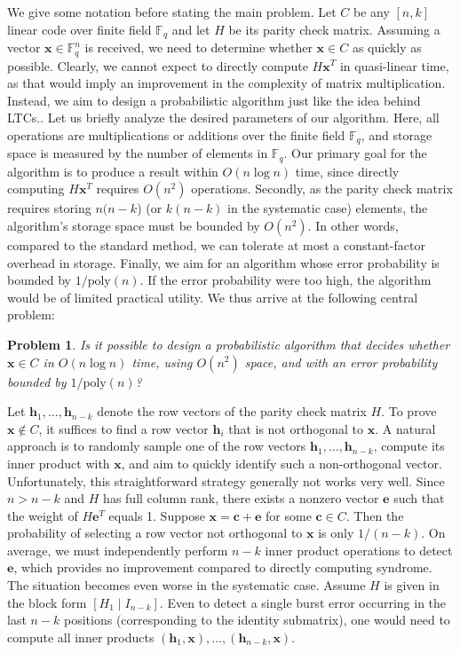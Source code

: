 \documentclass[a4paper, 10pt]{article}
\newtheorem{prob}[theorem]{Problem}
\begin{document}
 We give some notation before stating the main problem. Let $C$ be any $[n,k]$ linear code over finite field $\mathbb{F}_q$ and let $H$ be its parity check matrix. Assuming a vector $\mathbf{x}\in \mathbb{F}_q^n$ is received, we need to determine whether $\mathbf{x}\in C$ as quickly as possible. Clearly, we cannot expect to directly compute $H\mathbf{x}^T$ in quasi-linear time, as that would imply an improvement in the complexity of matrix multiplication. Instead, we aim to design a probabilistic algorithm just like the idea behind LTCs.. Let us briefly analyze the desired parameters of our algorithm. Here, all operations are multiplications or additions over the finite field $\mathbb{F}_q$, and storage space is measured by the number of elements in $\mathbb{F}_q$. Our primary goal for the algorithm is to produce a result within $ O(n\log n)$ time, since directly computing $H\mathbf{x}^T$ requires $O(n^2)$ operations. Secondly, as the parity check matrix requires storing $n(n-k$) (or $k(n-k)$ in the systematic case) elements, the algorithm's storage space must be bounded by $O(n^2)$. In other words, compared to the standard method, we can tolerate at most a constant-factor overhead in storage.  Finally, we aim for an algorithm whose error probability is bounded by $1/\mathrm{poly}(n)$. If the error probability were too high, the algorithm would  be of limited practical utility. We thus arrive at the following central problem:
\begin{prob}
\label{prob1.1}
    Is it possible to design a probabilistic algorithm that decides whether $\mathbf{x}\in C$ in $O(n \log n)$ time, using $O(n^2)$ space, and with an error probability bounded by $1/\mathrm{poly}(n)$?
\end{prob}

Let $\mathbf{h}_1, \dots, \mathbf{h}_{n-k}$ denote the row vectors of the parity check matrix $H$. 
To prove $\mathbf{x} \notin C$, it suffices to find a row vector $\mathbf{h}_i$ that is not orthogonal to $\mathbf{x}$. 
A natural approach is to randomly sample one of the row vectors $\mathbf{h}_1, \dots, \mathbf{h}_{n-k}$, 
compute its inner product with $\mathbf{x}$, and aim to quickly identify such a non-orthogonal vector. Unfortunately, this straightforward strategy generally not works very well. 
Since $n>n -k$ and $H$ has full column rank, there exists a nonzero vector $\mathbf{e}$ such that the weight of $H\mathbf{e}^T$ equals 1. Suppose $\mathbf{x} = \mathbf{c} + \mathbf{e}$ for some $\mathbf{c} \in C$. 
Then the probability of selecting a row vector not orthogonal to $\mathbf{x}$ is only $1/(n-k)$. On average, we must independently perform $n-k$ inner product operations to detect $\mathbf{e}$, which provides no improvement compared to directly computing syndrome. The situation becomes even worse in the systematic case. 
Assume $H$ is given in the block form $[H_1\;|\; I_{n-k}]$. Even to detect a single burst error occurring in the last $n-k$ positions 
(corresponding to the identity submatrix), one would need to compute all inner products $(\mathbf{h}_1, \mathbf{x}), \dots, (\mathbf{h}_{n-k}, \mathbf{x})$.
\end{document}
